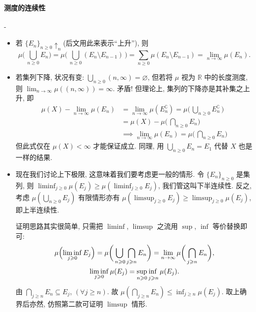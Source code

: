 \paragraph{测度的连续性}\mbox{}\kern-\ccwd\enote
\begin{itemize}
    \item 若 $\{E_n\}_{n\geqslant 0}\uparrow_n$(后文用此来表示``上升''), 则
          \[
              \mu \biggl(\, \bigcup_{n\geqslant 0}E_n \biggr) = \mu  \biggl(\, \bigcup_{n\geqslant 0}(E_n\setminus E_{n-1})\, \biggr) = \sum_{n\geqslant 0} \mu (E_n\setminus E_{n-1}) = \lim_{n \to \infty} \mu (E_n).
          \]
    \item 若集列下降, 状况有变: $\bigcup_{n\geqslant 0}(n,\infty) = \varnothing$, 但若将 $\mu $ 视为 $\mathbb R$ 中的长度测度, 则 $\lim_{n \to \infty} \mu((n,\infty))=\infty $. 矛盾! 但理论上, 集列的下降亦是其补集之上升, 即 \label{测度的连续性:集列下降}
          \[
              \begin{aligned}
                  \mu (X)-\lim_{n \to \infty} \mu (E_n) & = \lim_{n \to \infty} \mu (E_n^\complement)= \mu \biggl(\,\bigcup_{n\geqslant 0}E_n^\complement\,\biggr) \\
                                                        & = \mu(X) -  \mu \biggl(\,\bigcap_{n\geqslant 0}E_n\biggr)                                                \\
                                                        & \!\implies \lim_{n \to \infty}  \mu (E_n)=\mu \biggl(\,\bigcap_{n\geqslant 0}E_n\biggr)
              \end{aligned}
          \]
          但此式仅在 $\mu (X)<\infty$ 才能保证成立. 同理, 用 $\bigcup_{n\geqslant 0}E_n=E_1$ 代替 $X$ 也是一样的结果.
    \item 现在我们讨论上下极限, 这意味着我们要考虑更一般的情形. 令 $\{E_n\}_{n\geqslant 0}$ 是集列, 则 $\liminf_{j\geqslant 0} \mu (E_j)\geqslant \mu (\liminf_{j\geqslant 0} E_j)$, 我们管这叫下半连续性. 反之, 考虑 $\mu (\bigcup_{n\geqslant 0}E_j)$ 有限情形亦有 $\mu (\limsup_{j\geqslant 0} E_j)  \geqslant \limsup _{j\geqslant 0}\mu (E_j)$, 即上半连续性.

          证明思路其实很简单, 只需把 $\liminf$, $\limsup$ 之流用 $\sup$, $\inf$ 等价替换即可:
          \begin{gather*}
              \mu \Bigl(\liminf_{j\geqslant 0} E_j\Bigr)=\mu \biggl(\,\adjustlimits\bigcup_{n\geqslant 0}\bigcap_{j\geqslant n}E_n\biggr) = \lim_{n \to \infty}\mu \biggl(\,\bigcap_{j\geqslant n}E_n\biggr), \\
              \liminf_{j\geqslant 0}\mu(E_j) = \adjustlimits\sup_{n\geqslant 0}\inf_{j\geqslant n} \mu(E_j).
          \end{gather*}
          由 $\bigcap_{j\geqslant n}E_n\subseteq E_j$, $(\forall j\geqslant n)$. 故 $\mu (\bigcap_{j\geqslant n}E_n)\leqslant \inf_{j\geqslant n}\mu(E_j)$. 取上确界后亦然, 仿照第二款可证明 $\limsup$ 情形.
\end{itemize}
